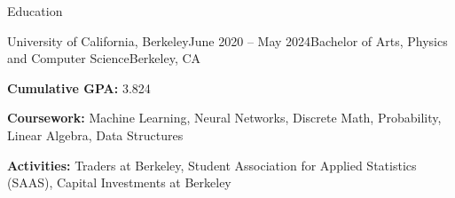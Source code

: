 \documentclass{resume} %
\begin{document}

\begin{rSection}{Education}
    \begin{rSubsection}{University of California, Berkeley}{June 2020 – May 2024}{Bachelor of Arts, Physics and Computer Science}{Berkeley, CA}
        \item {\bf Cumulative GPA:} 3.824
        \item {\bf Coursework:} Machine Learning, Neural Networks, Discrete Math, Probability, Linear Algebra, Data Structures
        \item {\bf Activities:} Traders at Berkeley, Student Association for Applied Statistics (SAAS), Capital Investments at Berkeley
        \end{rSubsection}
    \end{rSection}

\end{document}
